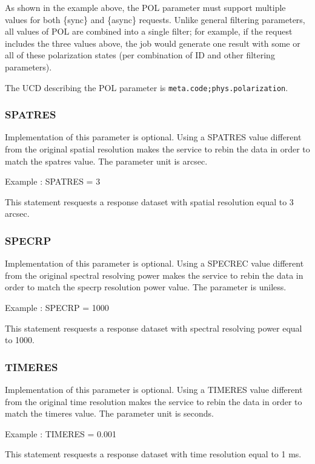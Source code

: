 \documentclass[11pt,a4paper]{ivoa}
\newcommand{\ucd}[1]{\texttt{#1}}
\begin{document}
As shown in the example above, the POL parameter must support multiple values 
for both \{sync\} and \{async\} requests.  Unlike general filtering parameters, 
all values of POL are combined into a single filter; for example, if the request
includes the three values above, the job would generate one result with
some or all of these polarization states (per combination of ID and
other filtering parameters).

The UCD  describing the POL parameter is
\ucd{meta.code;phys.polarization}.

\subsubsection{SPATRES}

Implementation of this parameter is optional. Using a SPATRES value different from the original spatial resolution makes the service to rebin the data in order to match the spatres value. The parameter unit is arcsec.  

Example : SPATRES = 3  

This statement resquests a response dataset with spatial resolution equal to 3 arcsec.

\subsubsection{SPECRP}

Implementation of this parameter is optional. Using a SPECREC value different from the original spectral resolving power makes the service to rebin the data in order to match the specrp resolution power value. The parameter is uniless.  

Example : SPECRP = 1000  

This statement resquests a response dataset with spectral resolving power  equal to 1000.

\subsubsection{TIMERES}

Implementation of this parameter is optional. Using a TIMERES value different from the original time resolution  makes the service to rebin the data in order to match the timeres value. The parameter unit is seconds.  

Example : TIMERES = 0.001  

This statement resquests a response dataset with time resolution equal to 1 ms.
\end{document}
